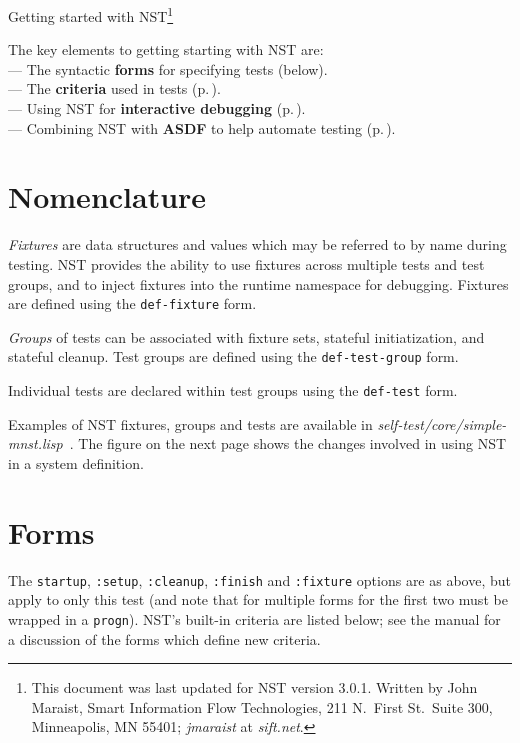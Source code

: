 \documentclass{article}
\begin{document}
\thispagestyle{empty}
\begin{center}
  \LARGE Getting started with NST\footnote{This document was last
    updated for NST version 3.0.1.  Written by John Maraist, Smart
    Information Flow Technologies, 211 N.\ First St.\ Suite 300,
    Minneapolis, MN 55401; \textsl{jmaraist} at \textsl{sift.net}.}
\end{center}

The key elements to getting starting with NST are:
%
\\\hspace*{0.5em}--- The syntactic \textbf{forms} for specifying tests
(below).
%
\\\hspace*{0.5em}--- The \textbf{criteria} used in tests
(p.\,\pageref{sec:criteria}).
%
\\\hspace*{0.5em}--- Using NST for \textbf{interactive debugging}
(p.\,\pageref{sec:interact}).
%
\\\hspace*{0.5em}--- Combining NST with \textbf{ASDF} to help automate
testing (p.\,\pageref{sec:asdf}).

\section*{Nomenclature}
\emph{Fixtures} are data structures and values which may be referred
to by name during testing.  NST provides the ability to use fixtures
across multiple tests and test groups, and to inject fixtures into the
runtime namespace for debugging.  Fixtures are defined using the
\texttt{def-fixture} form.

\emph{Groups} of tests can be associated with fixture sets, stateful
initiatization, and stateful cleanup.  Test groups are defined using
the \texttt{def-test-group} form.

Individual tests are declared within test groups using the
\texttt{def-test} form.

Examples of NST fixtures, groups and tests are available in
\textsl{self-test/core/simple-mnst.lisp}~.  The figure on the next
page shows the changes involved in using NST in a system definition.

\section*{Forms}

%

%
 
The \texttt{startup}, \texttt{:setup}, \texttt{:cleanup},
\texttt{:finish} and \texttt{:fixture} options are as above, but apply
to only this test (and note that for multiple forms for the first two
must be wrapped in a \texttt{progn}).  NST's built-in criteria are
listed below; see the manual for a discussion of the forms which
define new criteria.
\end{document}

